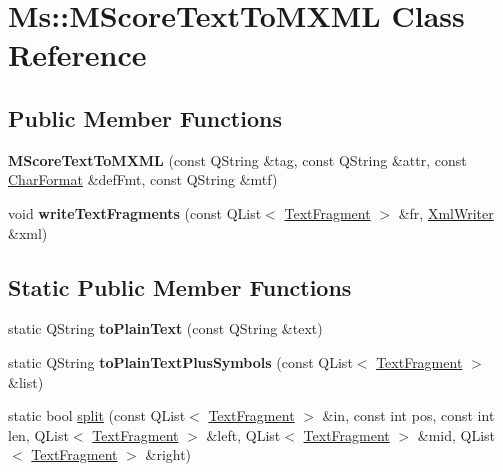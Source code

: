 \hypertarget{class_ms_1_1_m_score_text_to_m_x_m_l}{}\section{Ms\+:\+:M\+Score\+Text\+To\+M\+X\+ML Class Reference}
\label{class_ms_1_1_m_score_text_to_m_x_m_l}
\subsection*{Public Member Functions}
\begin{DoxyCompactItemize}
\item 
\mbox{\label{class_ms_1_1_m_score_text_to_m_x_m_l_a7de9057da0a3ef84a0191b25aec05f43}} 
{\bfseries M\+Score\+Text\+To\+M\+X\+ML} (const Q\+String \&tag, const Q\+String \&attr, const \hyperlink{class_ms_1_1_char_format}{Char\+Format} \&def\+Fmt, const Q\+String \&mtf)
\item 
\mbox{\label{class_ms_1_1_m_score_text_to_m_x_m_l_a0ab758520878f47131756443a946216a}} 
void {\bfseries write\+Text\+Fragments} (const Q\+List$<$ \hyperlink{class_ms_1_1_text_fragment}{Text\+Fragment} $>$ \&fr, \hyperlink{class_ms_1_1_xml_writer}{Xml\+Writer} \&xml)
\end{DoxyCompactItemize}
\subsection*{Static Public Member Functions}
\begin{DoxyCompactItemize}
\item 
\mbox{\label{class_ms_1_1_m_score_text_to_m_x_m_l_ae678a38569c5e42a5bac9e6e8003d2fb}} 
static Q\+String {\bfseries to\+Plain\+Text} (const Q\+String \&text)
\item 
\mbox{\label{class_ms_1_1_m_score_text_to_m_x_m_l_a87a6d3dbcc525c362dba1be50e4594b8}} 
static Q\+String {\bfseries to\+Plain\+Text\+Plus\+Symbols} (const Q\+List$<$ \hyperlink{class_ms_1_1_text_fragment}{Text\+Fragment} $>$ \&list)
\item 
static bool \hyperlink{class_ms_1_1_m_score_text_to_m_x_m_l_aff039b5b1f23a9875231705efb2a69de}{split} (const Q\+List$<$ \hyperlink{class_ms_1_1_text_fragment}{Text\+Fragment} $>$ \&in, const int pos, const int len, Q\+List$<$ \hyperlink{class_ms_1_1_text_fragment}{Text\+Fragment} $>$ \&left, Q\+List$<$ \hyperlink{class_ms_1_1_text_fragment}{Text\+Fragment} $>$ \&mid, Q\+List$<$ \hyperlink{class_ms_1_1_text_fragment}{Text\+Fragment} $>$ \&right)
\end{DoxyCompactItemize}


